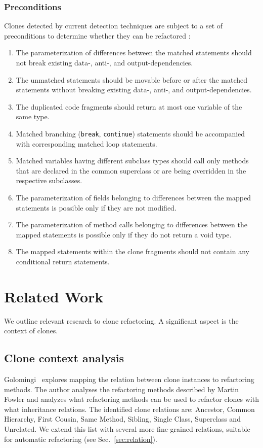 \documentclass[sigconf,review,anonymous]{acmart}
\begin{document}
\subsubsection{Preconditions}
Clones detected by current detection techniques \cite{kamiya2002ccfinder, deissenboeck2010flexible, jiang2007deckard, cordy2011nicad} are subject to a set of preconditions to determine whether they can be refactored \cite{tsantalis2015assessing}:
\begin{enumerate}
  \item The parameterization of differences between the matched statements should not break existing data-, anti-, and output-dependencies.
  \item The unmatched statements should be movable before or after the matched statements without breaking existing data-, anti-, and output-dependencies.
  \item The duplicated code fragments should return at most one variable of the same type.
  \item Matched branching (\texttt{break}, \texttt{continue}) statements should be accompanied with corresponding matched loop statements.
  \item Matched variables having different subclass types should call only methods that are declared in the common superclass or are being overridden in the respective subclasses.
  \item The parameterization of fields belonging to differences between the mapped statements is possible only if they are not modified.
  \item The parameterization of method calls belonging to differences between the mapped statements is possible only if they do not return a void type.
  \item The mapped statements within the clone fragments should not contain any conditional return statements.
\end{enumerate}

\section{Related Work}\label{sec:relatedwork}
We outline relevant research to clone refactoring. A significant aspect is the context of clones.

\subsection{Clone context analysis}\label{sec:rw:contextanalysis}
Golomingi~\cite{koni2001scenario} explores mapping the relation between clone instances to refactoring methods. The author analyses the refactoring methods described by Martin Fowler \cite{fowler1999refactoring} and analyzes what refactoring methods can be used to refactor clones with what inheritance relations. The identified clone relations are: Ancestor, Common Hierarchy, First Cousin, Same Method, Sibling, Single Class, Superclass and Unrelated. We extend this list with several more fine-grained relations, suitable for automatic refactoring (see Sec.~\ref{sec:relation}).
\end{document}
